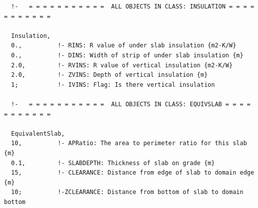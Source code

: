 \begin{lstlisting}
  !-   = = = = = = = = = = =  ALL OBJECTS IN CLASS: INSULATION = = = = = = = = = = =

  Insulation,
  0.,          !- RINS: R value of under slab insulation {m2-K/W}
  0.,          !- DINS: Width of strip of under slab insulation {m}
  2.0,         !- RVINS: R value of vertical insulation {m2-K/W}
  2.0,         !- ZVINS: Depth of vertical insulation {m}
  1;           !- IVINS: Flag: Is there vertical insulation

  !-   = = = = = = = = = = =  ALL OBJECTS IN CLASS: EQUIVSLAB = = = = = = = = = = =

  EquivalentSlab,
  10,          !- APRatio: The area to perimeter ratio for this slab {m}
  0.1,         !- SLABDEPTH: Thickness of slab on grade {m}
  15,          !- CLEARANCE: Distance from edge of slab to domain edge {m}
  10;          !-ZCLEARANCE: Distance from bottom of slab to domain bottom
\end{lstlisting}
